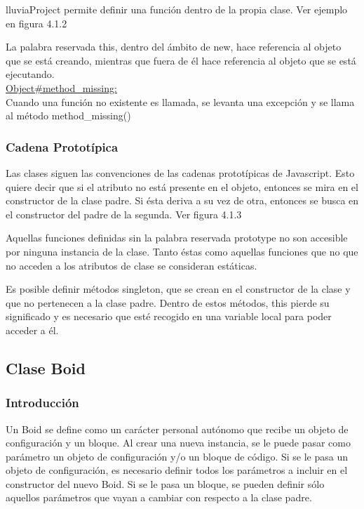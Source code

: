 lluviaProject permite definir una función dentro de la propia clase. Ver ejemplo en figura 4.1.2

La palabra reservada this, dentro del ámbito de new, hace referencia al objeto que se está creando, mientras que fuera de él hace 
referencia al objeto que se está ejecutando.\\

\underline{Object\#method\_missing:} \\
Cuando una función no existente es llamada, se levanta una excepción y se llama al método method\_missing()



\subsubsection{Cadena Prototípica}
\label{subsubsection:prototipos}

Las clases siguen las convenciones de las cadenas prototípicas de Javascript. Esto quiere decir que si el atributo no está presente en el 
objeto, entonces se mira en el constructor de la clase padre. Si ésta deriva a su vez de otra, entonces se busca en el constructor del 
padre de la segunda. Ver figura 4.1.3

Aquellas funciones definidas sin la palabra reservada prototype no son accesible por ninguna instancia de la clase. Tanto éstas como aquellas 
funciones que no que no acceden a los atributos de clase se consideran estáticas.

Es posible definir métodos singleton, que se crean en el constructor de la clase y que no pertenecen a la clase padre. Dentro de estos 
métodos, this pierde su significado y es necesario que esté recogido en una variable local para poder acceder a él.\\



\subsection{Clase Boid}
\label{subsection:boid}

\subsubsection{Introducción}
\label{subsubsection:boid_general}

Un Boid se define como un carácter personal autónomo que recibe un objeto de configuración y un bloque. Al crear una nueva instancia, se 
le puede pasar como parámetro un objeto de configuración y/o un bloque de código. Si se le pasa un objeto de configuración, es necesario 
definir todos los parámetros a incluir en el constructor del nuevo Boid. Si se le pasa un bloque, se pueden definir sólo aquellos parámetros 
que vayan a cambiar con respecto a la clase padre.

